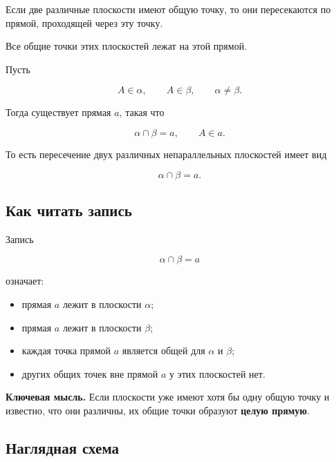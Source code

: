 \documentclass[a4paper,12pt]{article}
\newcommand{\keyidea}[1]{%
  \par\medskip
  {\color{darkaccent}\bfseries Ключевая мысль.} #1
  \par\medskip
}
\begin{document}
Если две различные плоскости имеют общую точку,
то они пересекаются по прямой, проходящей через эту точку.

Все общие точки этих плоскостей лежат на этой прямой.

Пусть

\[
A\in\alpha,\qquad
A\in\beta,\qquad
\alpha\ne\beta.
\]

Тогда существует прямая \(a\), такая что

\[
\alpha\cap\beta=a,
\qquad
A\in a.
\]

То есть пересечение двух различных непараллельных плоскостей имеет вид

\[
\boxed{\alpha\cap\beta=a}.
\]

\subsection{Как читать запись}

Запись

\[
\alpha\cap\beta=a
\]

означает:

\begin{itemize}
  \item прямая \(a\) лежит в плоскости \(\alpha\);
  \item прямая \(a\) лежит в плоскости \(\beta\);
  \item каждая точка прямой \(a\) является общей для
        \(\alpha\) и \(\beta\);
  \item других общих точек вне прямой \(a\) у этих плоскостей нет.
\end{itemize}

\keyidea{
Если плоскости уже имеют хотя бы одну общую точку и известно,
что они различны, их общие точки образуют \textbf{целую прямую}.
}


\subsection{Наглядная схема}
\end{document}
